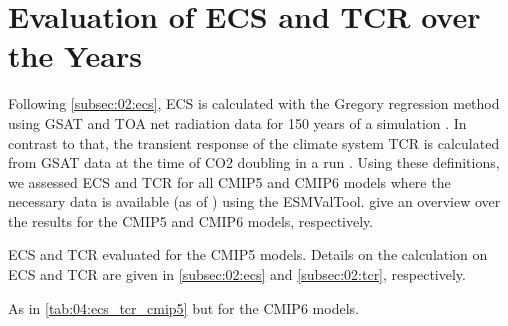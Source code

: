 \section{Evaluation of \acs{ECS} and \acs{TCR} over the Years}
\label{sec:04:evaluation_ecs_and_tcr}

Following \cref{subsec:02:ecs}, \ac{ECS} is calculated with the Gregory
regression method using \ac{GSAT} and \ac{TOA} net radiation data for 150 years
of a  simulation \autocite{Gregory2004}. In contrast to that, the
transient response of the climate system \ac{TCR} is calculated from \ac{GSAT}
data at the time of \ac{CO2} doubling in a \onepctcotwo{} run
. Using these definitions,
we assessed \ac{ECS} and \ac{TCR} for all \acs{CMIP}5 and \acs{CMIP}6 models
where the necessary data is available (as of \TheMonth{}) using the
\ac{ESMValTool}.  give an
overview over the results for the \acs{CMIP}5 and \acs{CMIP}6 models,
respectively.

\begin{table}[!t]
  \centering
  \caption{\acf{ECS} and \acf{TCR} evaluated for the \acs{CMIP}5 models.
    Details on the calculation on \acs{ECS} and \acs{TCR} are given in
    \cref{subsec:02:ecs} and \cref{subsec:02:tcr}, respectively.}
  \label{tab:04:ecs_tcr_cmip5}
\end{table}

\begin{table}[p]
  \centering
  \caption{As in \cref{tab:04:ecs_tcr_cmip5} but for the \acs{CMIP}6 models.}
  \label{tab:04:ecs_tcr_cmip6}
\end{table}

